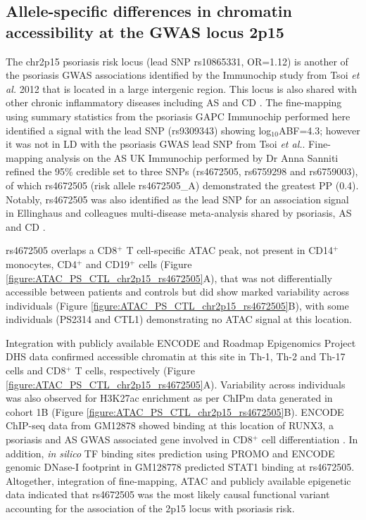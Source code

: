 \subsection{Allele-specific differences in chromatin accessibility at the GWAS locus 2p15}
The chr2p15 psoriasis risk locus (lead SNP rs10865331, OR=1.12) is another of the psoriasis GWAS associations identified by the Immunochip study from Tsoi \textit{et al.} 2012 that is located in a large intergenic region. This locus is also shared with other chronic inflammatory diseases including AS and CD \parencite{Cortes2013,Jostins2012}. The fine-mapping using summary statistics from the psoriasis GAPC Immunochip performed here identified a signal with the lead SNP (rs9309343) showing log$_{10}$ABF=4.3; however it was not in LD with the psoriasis GWAS lead SNP from Tsoi \textit{et al.}. Fine-mapping analysis on the AS UK Immunochip performed by Dr Anna Sanniti refined the 95\% credible set to three SNPs (rs4672505, rs6759298 and rs6759003), of which rs4672505 (risk allele rs4672505\_A) demonstrated the greatest PP (0.4). Notably, rs4672505 was also identified as the lead SNP for an association signal in Ellinghaus and colleagues multi-disease meta-analysis shared by psoriasis, AS and CD \parencite{Ellinghaus2016}.

rs4672505 overlaps a CD8$^+$ T cell-specific ATAC peak, not present in CD14$^+$ monocytes, CD4$^+$ and CD19$^+$ cells (Figure \ref{figure:ATAC_PS_CTL_chr2p15_rs4672505}A), that was not differentially accessible between patients and controls but did show marked variability across individuals (Figure \ref{figure:ATAC_PS_CTL_chr2p15_rs4672505}B), with some individuals (PS2314 and CTL1) demonstrating no ATAC signal at this location. 

Integration with publicly available ENCODE and Roadmap Epigenomics Project DHS data confirmed accessible chromatin at this site in Th-1, Th-2 and Th-17 cells and CD8$^+$ T cells, respectively (Figure \ref{figure:ATAC_PS_CTL_chr2p15_rs4672505}A). Variability across individuals was also observed for H3K27ac enrichment as per ChIPm data generated in cohort 1B (Figure \ref{figure:ATAC_PS_CTL_chr2p15_rs4672505}B). ENCODE ChIP-seq data from GM12878 showed binding at this location of RUNX3, a psoriasis and AS GWAS associated gene involved in CD8$^+$ cell differentiation \parencite{Wong2011}. In addition, \textit{in silico} TF binding sites prediction using PROMO \parencite{Messeguer2002} and ENCODE genomic DNase-I footprint in GM128778 predicted STAT1 binding at rs4672505. Altogether, integration of fine-mapping, ATAC and publicly available epigenetic data indicated that rs4672505 was the most likely causal functional variant accounting for the association of the 2p15 locus with psoriasis risk.


